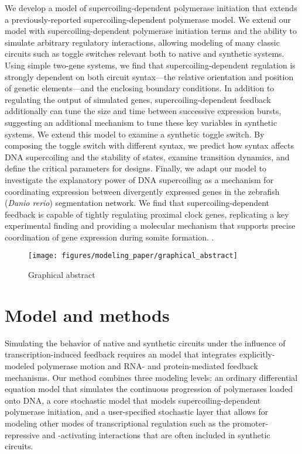 \documentclass[11pt]{article}
\begin{document}
We develop a model of supercoiling-dependent polymerase initiation that extends a previously-reported supercoiling-dependent polymerase model.  \parencite{sevierPropertiesGeneExpression2018}  We extend our model with supercoiling-dependent polymerase initiation terms and the ability to simulate arbitrary regulatory interactions, allowing modeling of many classic circuits such as toggle switches relevant both to native and synthetic systems. Using simple two-gene systems, we find that supercoiling-dependent regulation is strongly dependent on both circuit syntax---the relative orientation and position of genetic elements---and the enclosing boundary conditions. In addition to regulating the output of simulated genes, supercoiling-dependent feedback additionally can tune the size and time between successive expression bursts, suggesting an additional mechanism to tune these key variables in synthetic systems. We extend this model to examine a synthetic toggle switch. By composing the toggle switch with different syntax, we predict how syntax affects DNA supercoiling and the stability of states, examine transition dynamics, and define the critical parameters for designs. Finally, we adapt our model to investigate the explanatory power of DNA supercoiling as a mechanism for coordinating expression between divergently expressed genes in the zebrafish (\textit{Danio rerio}) segmentation network. We find that supercoiling-dependent feedback is capable of tightly regulating proximal clock genes, replicating a key experimental finding and providing a molecular mechanism that supports precise coordination of gene expression during somite formation. \parencite{zinaniPairingSegmentationClock2021}.

\begin{figure}[h]
    \centering
    \texttt{[image: figures/modeling\_paper/graphical\_abstract]}
    \caption{Graphical abstract} \label{fig:graphical_abstract}
\end{figure}

\section{Model and methods}
Simulating the behavior of native and synthetic circuits under the influence of transcription-induced feedback requires an model that integrates explicitly-modeled polymerase motion and RNA- and protein-mediated feedback mechanisms.
Our method combines three modeling levels: an ordinary differential equation model that simulates the continuous progression of polymerases loaded onto DNA, a core stochastic model that models supercoiling-dependent polymerase initiation, and a user-specified stochastic layer that allows for modeling other modes of transcriptional regulation such as the promoter-repressive and -activating interactions that are often included in synthetic circuits.
\end{document}
